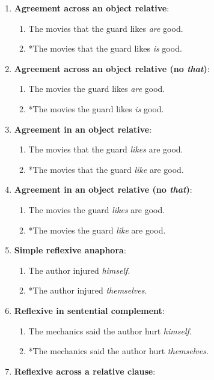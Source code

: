 \begin{enumerate}[noitemsep]
  \item \textbf{Agreement across an object relative}:
    \begin{enumerate}
      \item The movies that the guard likes \textit{are} good.
      \item *The movies that the guard likes \textit{is} good.
    \end{enumerate}
  \item \textbf{Agreement across an object relative (no \textit{that})}:
    \begin{enumerate}
      \item The movies the guard likes \textit{are} good.
      \item *The movies the guard likes \textit{is} good.
    \end{enumerate}
  \item \textbf{Agreement in an object relative}:
    \begin{enumerate}
      \item The movies that the guard \textit{likes} are good.
      \item *The movies that the guard \textit{like} are good.
    \end{enumerate}
  \item \textbf{Agreement in an object relative (no \textit{that})}:
    \begin{enumerate}
      \item The movies the guard \textit{likes} are good.
      \item *The movies the guard \textit{like} are good.
    \end{enumerate}
  \item \textbf{Simple reflexive anaphora}:
    \begin{enumerate}
      \item The author injured \textit{himself}.
      \item *The author injured \textit{themselves}.
    \end{enumerate}
  \item \textbf{Reflexive in sentential complement}:
    \begin{enumerate}
      \item The mechanics said the author hurt \textit{himself}.
      \item *The mechanics said the author hurt \textit{themselves}.
    \end{enumerate}
  \item \textbf{Reflexive across a relative clause}:

\end{enumerate}
